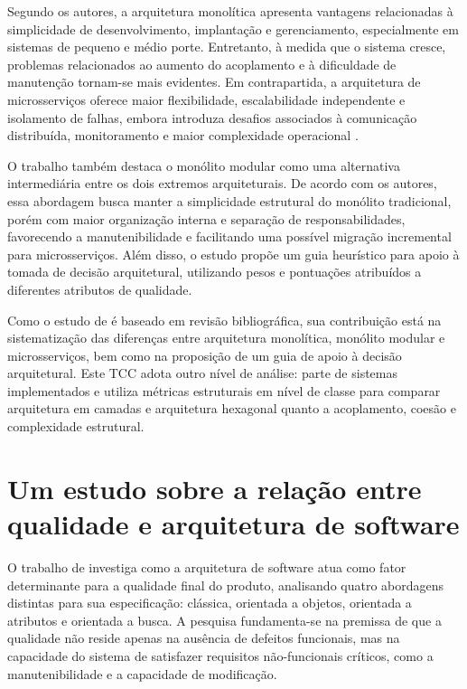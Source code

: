 Segundo os autores, a arquitetura monolítica apresenta vantagens relacionadas à simplicidade de desenvolvimento, implantação e gerenciamento, 
especialmente em sistemas de pequeno e médio porte. Entretanto, à medida que o sistema cresce, problemas relacionados ao aumento do acoplamento
e à dificuldade de manutenção tornam-se mais evidentes. Em contrapartida, a arquitetura de microsserviços oferece maior flexibilidade, 
escalabilidade independente e isolamento de falhas, embora introduza desafios associados à comunicação distribuída, monitoramento e maior 
complexidade operacional \cite{cintra2025}.

O trabalho também destaca o monólito modular como uma alternativa intermediária entre os dois extremos arquiteturais. 
De acordo com os autores, essa abordagem busca manter a simplicidade estrutural do monólito tradicional, porém com maior organização interna 
e separação de responsabilidades, favorecendo a manutenibilidade e facilitando uma possível migração incremental para microsserviços. 
Além disso, o estudo propõe um guia heurístico para apoio à tomada de decisão arquitetural, utilizando pesos e pontuações atribuídos a 
diferentes atributos de qualidade.

Como o estudo de  é baseado em revisão bibliográfica, sua contribuição está na sistematização das diferenças 
entre arquitetura monolítica, monólito modular e microsserviços, bem como na proposição de um guia de apoio à decisão arquitetural. 
Este TCC adota outro nível de análise: parte de sistemas implementados e utiliza métricas estruturais em nível de classe para comparar 
arquitetura em camadas e arquitetura hexagonal quanto a acoplamento, coesão e complexidade estrutural.

\section{Um estudo sobre a relação entre qualidade e arquitetura de software}
\label{sec:um-estudo-sobre-a-relacao-entre-qualidade-e-arquitetura-de-software}

O trabalho de  investiga como a arquitetura de software atua como fator determinante para a qualidade final do 
produto, analisando quatro abordagens distintas para sua especificação: clássica, orientada a objetos, orientada a atributos e orientada 
a busca. A pesquisa fundamenta-se na premissa de que a qualidade não reside apenas na ausência de defeitos funcionais, mas na capacidade do 
sistema de satisfazer requisitos não-funcionais críticos, como a manutenibilidade e a capacidade de modificação.

